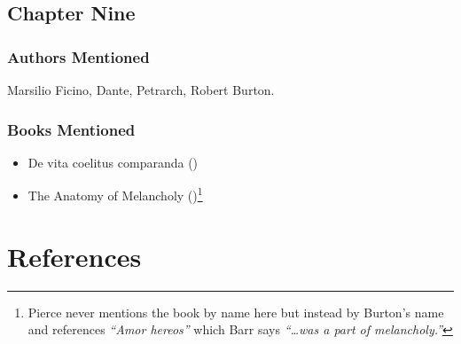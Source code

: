 \documentclass[
]{article}
\providecommand{\tightlist}{%
  \setlength{\itemsep}{0pt}\setlength{\parskip}{0pt}}
\begin{document}
\subsection{Chapter Nine}\label{chapter-nine-1}

\subsubsection{Authors Mentioned}\label{authors-mentioned-24}

Marsilio Ficino, Dante, Petrarch, Robert Burton.

\subsubsection{Books Mentioned}\label{books-mentioned-24}

\begin{itemize}
\tightlist
\item
  De vita coelitus comparanda ()
\item
  The Anatomy of Melancholy ()\footnote{Pierce never mentions the book by name here but
    instead by Burton's name and references \emph{``Amor hereos''} which
    Barr says \emph{``\ldots was a part of melancholy.''}}
\end{itemize}

\newpage

\section{References}\label{references}
\end{document}
